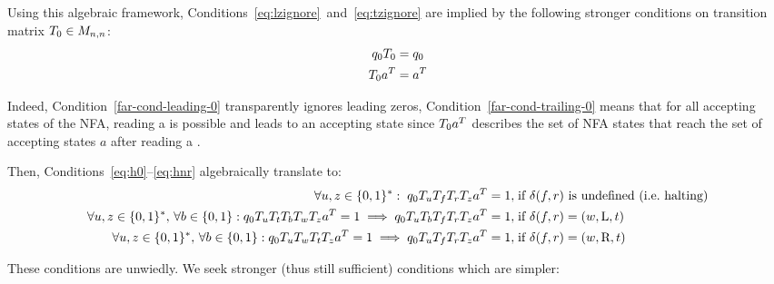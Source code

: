 Using this algebraic framework, Conditions~\eqref{eq:lzignore}~and~\eqref{eq:tzignore} are implied by the following stronger conditions on transition matrix $T_0 \in M_{n,n}$:
\begin{align}
    q_0 T_0 & = q_0
    \label{far-cond-leading-0}
    \\
    T_0 a^{T} & = a^{T}
    \label{far-cond-trailing-0}
\end{align}

Indeed, Condition~\eqref{far-cond-leading-0} transparently ignores leading zeros, Condition~\eqref{far-cond-trailing-0} means that for all accepting states of the NFA, reading a \szero is possible and leads to an accepting state since $T_0 a^{T}$ describes the set of NFA states that reach the set of accepting states $a$ after reading a \szero.

Then, Conditions~\ref{eq:h0}--\eqref{eq:hnr} algebraically translate to:
{\small
\begin{align*}
    \forall u,z\in\{0, 1\}^*: \; q_0 T_u T_f T_r T_z a^{T} = 1, \;                                                                           & \text{if $\delta(f,r)$ is undefined (i.e.~halting)}
    \\
    \forall u,z\in\{0, 1\}^*,\,\forall b \in \{0, 1\}: q_0 T_{u} T_t T_b T_w T_{z} a^{T} = 1 \implies q_0 T_{u} T_b T_f T_r T_{z} a^{T} = 1,\; & \text{if $\delta(f,r) = (w,\text{L},t)$}
    \\
    \forall u,z\in\{0, 1\}^*,\,\forall b \in \{0, 1\}: q_0 T_{u} T_w T_t T_{z} a^{T} = 1 \implies q_0 T_{u} T_f T_r T_{z} a^{T} = 1,\;         & \text{if $\delta(f,r) = (w,\text{R},t)$}
\end{align*}
}

These conditions are unwiedly. We seek stronger (thus still sufficient) conditions which are simpler:


